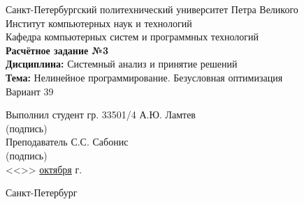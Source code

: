 \begin{titlepage}
\begin{center}
	Санкт-Петербургский политехнический университет Петра Великого\\[0.3cm]
	Институт компьютерных наук и технологий \\[0.3cm]
	Кафедра компьютерных систем и программных технологий\\[4cm]
	
	\textbf{Расчётное задание №3}\\[2mm]
	\textbf{Дисциплина:} Системный анализ и принятие решений\\[2mm]
	\textbf{Тема:} Нелинейное программирование. Безусловная оптимизация\\[2mm]
	Вариант 39\\[6.5cm]
\end{center}

\begin{flushleft}
	\hspace*{5mm} Выполнил студент гр. 33501/4  \hspace*{3cm}\sign[3cm]\hspace*{2mm} А.Ю. Ламтев\\
	\hspace*{10.85cm} (подпись)\\[2.5mm]
	\hspace*{5mm} Преподаватель \hspace*{6.45cm}\sign[3cm]\hspace*{2mm} С.С. Сабонис\\
	\hspace*{10.85cm} (подпись)\\[2.5mm]
	\hspace*{11.1cm} <<\underline{\the\day}>> \underline{\hspace{5mm}октября\hspace{5mm}} \the\year\hspace{1mm} г.
\end{flushleft}

\vfill

\begin{center}
	Санкт-Петербург\\
	\the\year
\end{center}
\end{titlepage}
\addtocounter{page}{1}